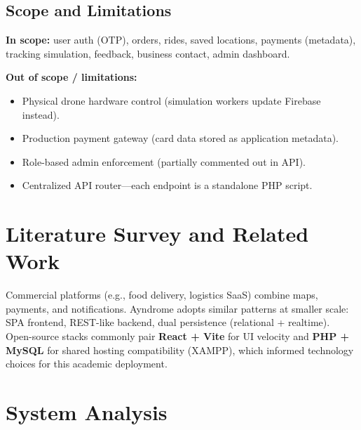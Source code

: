 \documentclass[12pt,a4paper,oneside]{report}
\begin{document}
\section{Scope and Limitations}
\textbf{In scope:} user auth (OTP), orders, rides, saved locations, payments (metadata),
tracking simulation, feedback, business contact, admin dashboard.

\textbf{Out of scope / limitations:}
\begin{itemize}[noitemsep]
    \item Physical drone hardware control (simulation workers update Firebase instead).
    \item Production payment gateway (card data stored as application metadata).
    \item Role-based admin enforcement (partially commented out in API).
    \item Centralized API router---each endpoint is a standalone PHP script.
\end{itemize}

\chapter{Literature Survey and Related Work}

Commercial platforms (e.g., food delivery, logistics SaaS) combine maps, payments, and
notifications. Ayndrome adopts similar patterns at smaller scale: SPA frontend, REST-like
backend, dual persistence (relational + realtime). Open-source stacks commonly pair
\textbf{React + Vite} for UI velocity and \textbf{PHP + MySQL} for shared hosting compatibility
(XAMPP), which informed technology choices for this academic deployment.

\chapter{System Analysis}
\end{document}
